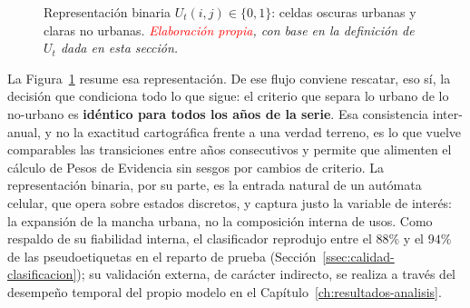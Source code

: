 \begin{figure}
  \vspace{-4pt}
  \centering
  \shorthandoff{<>}%
  \caption{\small Representación binaria $U_t(i,j)\in\{0,1\}$: celdas oscuras urbanas y claras no urbanas. \textit{\textcolor{red}{Elaboración propia}, con base en la definición de $U_t$ dada en esta sección.}}
  \label{fig:mapa-binario}
  \vspace{-6pt}
\end{figure}
La Figura~\ref{fig:mapa-binario} resume esa representación. De ese flujo conviene rescatar, eso sí, la decisión que condiciona todo lo que sigue: el criterio que separa lo urbano de lo no-urbano es \textbf{idéntico para todos los años de la serie}. Esa consistencia inter-anual, y no la exactitud cartográfica frente a una verdad terreno, es lo que vuelve comparables las transiciones entre años consecutivos y permite que alimenten el cálculo de Pesos de Evidencia sin sesgos por cambios de criterio. La representación binaria, por su parte, es la entrada natural de un autómata celular, que opera sobre estados discretos, y captura justo la variable de interés: la expansión de la mancha urbana, no la composición interna de usos. Como respaldo de su fiabilidad interna, el clasificador reprodujo entre el $88\%$ y el $94\%$ de las pseudoetiquetas en el reparto de prueba (Sección~\ref{ssec:calidad-clasificacion}); su validación externa, de carácter indirecto, se realiza a través del desempeño temporal del propio modelo en el Capítulo~\ref{ch:resultados-analisis}.

